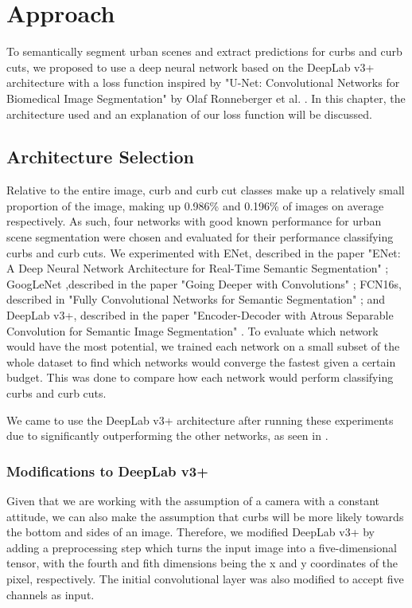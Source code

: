 \chapter{Approach}\label{chap:approach}
To semantically segment urban scenes and extract predictions for curbs and curb cuts, we proposed to use a deep neural network based on the DeepLab v3+ architecture with a loss function inspired by "U-Net: Convolutional Networks for Biomedical Image Segmentation" by Olaf Ronneberger et al. \cite{unet}.
In this chapter, the architecture used and an explanation of our loss function will be discussed.

\section{Architecture Selection} \label{section:approach-architectureselection}
Relative to the entire image, curb and curb cut classes make up a relatively small proportion of the image, making up 0.986\% and 0.196\% of images on average respectively.
As such, four networks with good known performance for urban scene segmentation were chosen and evaluated for their performance classifying curbs and curb cuts.
We experimented with ENet, described in the paper "ENet: A Deep Neural Network Architecture for Real-Time Semantic Segmentation" \cite{enet}; GoogLeNet ,described in the paper "Going Deeper with Convolutions" \cite{googlenet}; FCN16s, described in "Fully Convolutional Networks for Semantic Segmentation" \cite{fcn}; and DeepLab v3+, described in the paper "Encoder-Decoder with Atrous Separable Convolution for Semantic Image Segmentation" \cite{deeplab}.
To evaluate which network would have the most potential, we trained each network on a small subset of the whole dataset to find which networks would converge the fastest given a certain budget.
This was done to compare how each network would perform classifying curbs and curb cuts.

We came to use the DeepLab v3+ architecture after running these experiments due to significantly outperforming the other networks, as seen in .

\subsection{Modifications to DeepLab v3+}\label{section:approach-extendingdeeplab}
Given that we are working with the assumption of a camera with a constant attitude, we can also make the assumption that curbs will be more likely towards the bottom and sides of an image.
Therefore, we modified DeepLab v3+ by adding a preprocessing step which turns the input image into a five-dimensional tensor, with the fourth and fith dimensions being the x and y coordinates of the pixel, respectively.
The initial convolutional layer was also modified to accept five channels as input.

